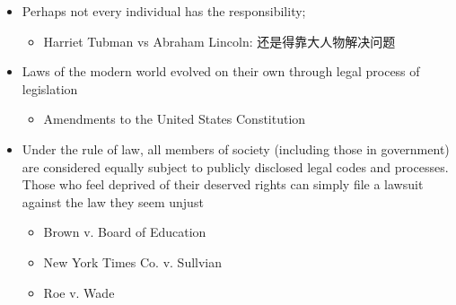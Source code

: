 \begin{itemize}
\begin{itemize}
      \item Perhaps not every individual has the responsibility;
      \begin{itemize}
        \item Harriet Tubman vs Abraham Lincoln: 还是得靠大人物解决问题
      \end{itemize}

      \item Laws of the modern world evolved on their own through
      legal process of legislation
      \begin{itemize}
        \item Amendments to the United States Constitution
      \end{itemize}

      \item Under the rule of law, all members of society
      (including those in government) are considered equally subject to
      publicly disclosed legal codes and processes. Those who feel deprived
      of their deserved rights can simply file a lawsuit against the law
      they seem unjust
      \begin{itemize}
        \item Brown v. Board of Education
        \item New York Times Co. v. Sullvian
        \item Roe v. Wade
      \end{itemize}
    \end{itemize}
  \end{itemize}
